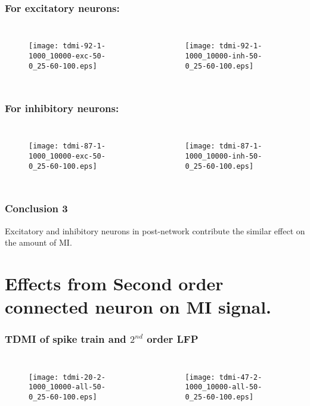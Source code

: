 \documentclass{beamer}
\begin{document}
	\begin{frame}
	\frametitle{For excitatory neurons:}
	\begin{columns}[b]
	\begin{figure}
	\centering
	\texttt{[image: tdmi-92-1-1000\_10000-exc-50-0\_25-60-100.eps]}	
	\label{fig:8}
	\end{figure}
	\begin{figure}
	\texttt{[image: tdmi-92-1-1000\_10000-inh-50-0\_25-60-100.eps]}	
	\label{fig:9}
	\end{figure}
	\end{columns}	
	\end{frame}
	
	\begin{frame}
	\frametitle{For inhibitory neurons:}
	\begin{columns}[b]
	\column{.5\textwidth}
	\begin{figure}
	\centering
	\texttt{[image: tdmi-87-1-1000\_10000-exc-50-0\_25-60-100.eps]}	
	\label{fig:10}
	\end{figure}
	
	\column{.5\textwidth}
	\begin{figure}
	\texttt{[image: tdmi-87-1-1000\_10000-inh-50-0\_25-60-100.eps]}	
	\label{fig:11}
	\end{figure}
	\end{columns}
	\end{frame}
	
	\begin{frame}
	\frametitle{Conclusion 3}
	Excitatory and inhibitory neurons in post-network contribute the similar effect on the amount of MI.
	\end{frame}
	
	\section{Effects from Second order connected neuron on MI signal.}
	\begin{frame}
	\frametitle{TDMI of spike train and $2^{nd}$ order LFP}
	
	\begin{columns}[b]
	\begin{figure}
	\centering
	\texttt{[image: tdmi-20-2-1000\_10000-all-50-0\_25-60-100.eps]}	
	\label{fig:33}
	\end{figure}
		
	\begin{figure}
	\centering
	\texttt{[image: tdmi-47-2-1000\_10000-all-50-0\_25-60-100.eps]}	
	\label{fig:33}
	\end{figure}
	\end{columns}
	\end{frame}
	
\end{document}
